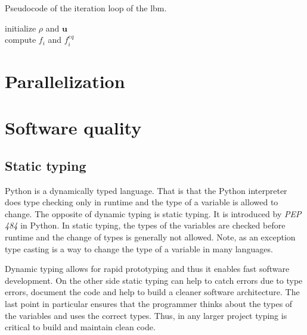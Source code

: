 \documentclass[a4paper,11pt, footsepline]{book}
\begin{document}
\begin{algorithm} %
 \caption{\label{algo-pseudeocode}Pseudocode of the iteration loop of the \ac{lbm}.}
     \SetAlgoLined
     initialize $\rho$ and $\mathbf{u}$ \\
     compute $f_i$ and $f_i^{eq}$ \\

\end{algorithm}
\section{Parallelization}
\section{Software quality}
\subsection*{Static typing}
Python is a dynamically typed language. That is that the Python interpreter does type checking only in runtime and the type of a variable is allowed to change. The opposite of dynamic typing is static typing. It is introduced by \textit{PEP 484} in Python. In static typing, the types of the variables are checked before runtime and the change of types is generally not allowed. Note, as an exception type casting is a way to change the type of a variable in many languages.

Dynamic typing allows for rapid prototyping and thus it enables fast software development. On the other side static typing can help to catch errors due to type errors, document the code and help to build a cleaner software architecture. The last point in particular ensures that the programmer thinks about the types of the variables and uses the correct types. Thus, in any larger project typing is critical to build and maintain clean code.
\end{document}
